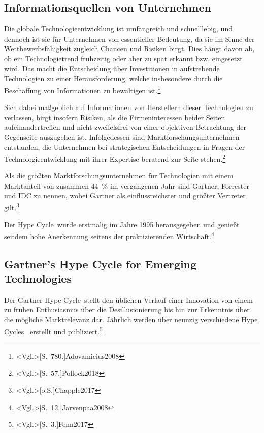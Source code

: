 \subsection{Informationsquellen von Unternehmen}
Die globale Technologieentwicklung ist umfangreich und schnelllebig, und dennoch ist sie für Unternehmen von essentieller Bedeutung, da sie im Sinne der Wettbewerbsfähigkeit zugleich Chancen und Risiken birgt. Dies hängt davon ab, ob ein Technologietrend frühzeitig oder aber zu spät erkannt bzw. eingesetzt wird. Das macht die Entscheidung über Investitionen in aufstrebende Technologien zu einer Herausforderung, welche insbesondere durch die Beschaffung von Informationen zu bewältigen ist.\footnote{\citeNP<Vgl.>[S.~780.]{Adovamicius2008}}

Sich dabei maßgeblich auf Informationen von Herstellern dieser Technologien zu verlassen, birgt insofern Risiken, als die Firmeninteressen beider Seiten aufeinandertreffen und nicht zweifelsfrei von einer objektiven Betrachtung der Gegenseite auszugehen ist. Infolgedessen sind Marktforschungsunternehmen entstanden, die Unternehmen bei strategischen Entscheidungen in Fragen der Technologieentwicklung mit ihrer Expertise beratend zur Seite stehen.\footnote{\citeNP<Vgl.>[S.~57.]{Pollock2018}}

Als die größten Marktforschungsunternehmen für Technologien mit einem Marktanteil von zusammen 44~\% im vergangenen Jahr sind Gartner, Forrester und IDC zu nennen, wobei Gartner als einflussreichster und größter Vertreter gilt.\footnote{\citeNP<Vgl.>[o.S.]{Chapple2017}}

Der \glqq Hype Cycle\grqq~wurde erstmalig im Jahre 1995 herausgegeben und genießt seitdem hohe Anerkennung seitens der praktizierenden Wirtschaft.\footnote{\citeNP<Vgl.>[S.~12.]{Jarvenpaa2008}}

\subsection{Gartner’s Hype Cycle for Emerging Technologies}
Der \glqq Gartner Hype Cycle\grqq~stellt den üblichen Verlauf einer Innovation von einem zu frühen Enthusiasmus über die Desillusionierung bis hin zur Erkenntnis über die mögliche Marktrelevanz dar. Jährlich werden über neunzig verschiedene \glqq Hype Cycles\grqq~ erstellt und publiziert.\footnote{\citeNP<Vgl.>[S.~3.]{Fenn2017}}


